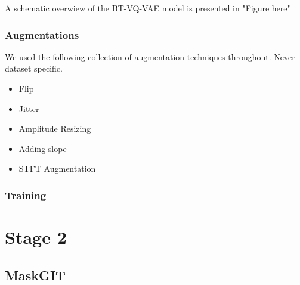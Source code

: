 \documentclass[../../thesis.tex]{subfiles}
\begin{document}
A schematic overwiew of the BT-VQ-VAE model is presented in "Figure here"

\subsubsection{Augmentations}
We used the following collection of augmentation techniques throughout. Never dataset specific.
\begin{itemize}
    \item Flip
    \item Jitter
    \item Amplitude Resizing
    \item Adding slope
    \item STFT Augmentation
\end{itemize}

\subsubsection{Training}

\section{Stage 2}

\subsection{MaskGIT}
\end{document}
